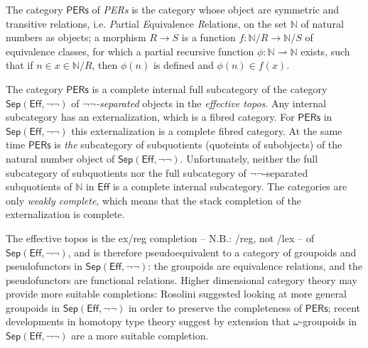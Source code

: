 \documentclass[12pt, a4paper]{article}
\theoremstyle{plain}
\theoremstyle{definition}
\begin{document}


\newcommand\N{\mathbb N}
\newcommand\partar\rightharpoonup
\newcommand\pers{\mathsf{PERs}}
\newcommand\sep{\mathsf{Sep}}
\newcommand\eff{\mathsf{Eff}}
The category $\pers$ of \emph{PERs} is the category whose object are symmetric and transitive relations, i.e. \emph Partial \emph Equivalence \emph Relations, on the set $\N$ of natural numbers as objects; a morphism $R\to S$ is a function $f:\N/R \to \N/S$ of equivalence classes, for which a partial recursive function $\phi: \N\partar\N$ exists, such that if $n\in x \in \N/R$, then $\phi(n)$ is defined and $\phi(n)\in f(x)$.

The category $\pers$ is a complete internal full subcategory of the category $\sep(\eff,\neg\neg)$ of \emph{$\neg\neg$-separated} objects in the \emph{effective topos}. Any internal subcategory has an externalization, which is a fibred category. For $\pers$ in $\sep(\eff,\neg\neg)$ this externalization is a complete fibred category. At the same time $\pers$ is \emph{the} subcategory of subquotients (quoteints of subobjects) of the natural number object of $\sep(\eff,\neg\neg)$. 
Unfortunately, neither the full subcategory of subquotients nor the full subcategory of $\neg\neg$-separated subquotients of $\N$ in $\eff$ is a complete internal subcategory. The categories are only \emph{weakly complete}, which means that the stack completion of the externalization is complete. 

The effective topos is the ex/reg completion -- N.B.: /reg, not /lex -- of $\sep(\eff,\neg\neg)$, and is therefore pseudoequivalent to a category of groupoids and pseudofunctors in $\sep(\eff,\neg\neg)$: the groupoids are equivalence relations, and the pseudofunctors are functional relations. Higher dimensional category theory may provide more suitable completions: Rosolini suggested looking at more general groupoids in $\sep(\eff,\neg\neg)$ in order to preserve the completeness of $\pers$; recent developments in homotopy type theory suggest by extension that $\omega$-groupoids in $\sep(\eff,\neg\neg)$ are a more suitable completion.

\end{document}

